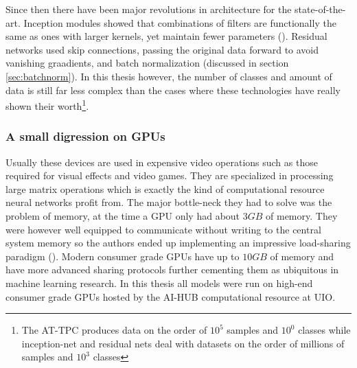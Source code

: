Since then there have been major revolutions in architecture for the state-of-the-art. Inception modules showed that combinations of filters are functionally the same as ones with larger kernels, yet maintain fewer parameters (\cite{Szegedy2014}). Residual networks used skip connections, passing the original data forward to avoid vanishing graadients, and batch normalization (discussed in section \ref{sec:batchnorm}). In this thesis however, the number of classes and amount of data is still far less complex than the cases where these technologies have really shown their worth\footnote{The AT-TPC produces data on the order of $10^5$ samples and $10^0$ classes while inception-net and residual nets deal with datasets on the order of millions of samples and $10^3$ classes}.

\subsubsection{A small digression on GPUs}
Usually these devices are used in expensive video operations such as those required for visual effects and video games. They are specialized in processing large matrix operations which is exactly the kind of computational resource neural networks profit from. The major bottle-neck they had to solve was the problem of memory, at the time a GPU only had about $3 GB$ of memory. They were however well equipped to communicate without writing to the central system memory so the authors ended up implementing an impressive load-sharing paradigm (\cite{Krizhevsky2012}). Modern consumer grade GPUs have up to $10 GB$ of memory and have more advanced sharing protocols further cementing them as ubiquitous in machine learning research. In this thesis all models were run on high-end consumer grade GPUs hosted by the AI-HUB computational resource at UIO.

